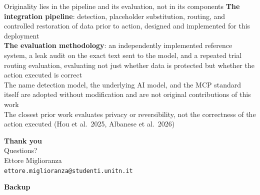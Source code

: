 \documentclass[aspectratio=169,11pt]{beamer}
\begin{document}
\begin{frame}{Originality lies in the pipeline and its evaluation, not in its components}
  \small
  \vspace{2mm}
  \textbf{The integration pipeline}: detection, placeholder substitution, routing, and controlled restoration of data prior to action, designed and implemented for this deployment\\[4mm]
  \textbf{The evaluation methodology}: an independently implemented reference system, a leak audit on the exact text sent to the model, and a repeated trial routing evaluation, evaluating not just whether data is protected but whether the action executed is correct\\[4mm]
  The name detection model, the underlying AI model, and the MCP standard itself are adopted without modification and are not original contributions of this work\\[4mm]
  {\footnotesize\color{slidegray} The closest prior work evaluates privacy or reversibility, not the correctness of the action executed (Hou et al.\ 2025, Albanese et al.\ 2026)}
\end{frame}

\begin{frame}[plain]
  \centering
  \vspace{1.5cm}
  {\Large\bfseries Thank you}\\[4mm]
  {\normalsize Questions?}\\[1cm]
  {\small Ettore Miglioranza \\ \texttt{ettore.miglioranza@studenti.unitn.it}}
\end{frame}

\begin{frame}[plain]
  \centering
  \vspace{2cm}
  {\Large\bfseries Backup}
\end{frame}
\end{document}
